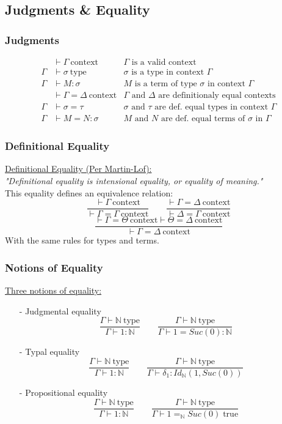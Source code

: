 \documentclass[aspectratio=169]{beamer}
\newcommand{\cntxt}{\ \mathrm{context}}
\newcommand{\typ}{\ \mathrm{type}}
\newcommand{\N}{\mathbb{N}}
\begin{document}
    \subsection{Judgments \& Equality}
    \begin{frame}
        \frametitle{Judgments}
        \begin{align*}
            &\vdash \Gamma \cntxt &\Gamma \text{ is a valid context}\\
            \Gamma &\vdash \sigma \typ &\sigma \text{ is a type in context $\Gamma$}\\
            \Gamma &\vdash M : \sigma &M\text{ is a term of type $\sigma$ in context $\Gamma$}\\
            &\vdash \Gamma = \Delta \cntxt &\text{$\Gamma$ and $\Delta$ are definitionaly equal contexts}\\
            \Gamma &\vdash \sigma = \tau &\text{$\sigma$ and $\tau$ are def. equal types in context $\Gamma$}\\
            \Gamma &\vdash M = N : \sigma &M\text{ and }N\text{ are def. equal terms of $\sigma$ in $\Gamma$}
        \end{align*}
    \end{frame}
    \begin{frame}
        \frametitle{Definitional Equality}
        \underline{Definitional Equality (Per Martin-Lof):}\\
        \vspace{10pt}
        \emph{"Definitional equality is intensional equality, or equality of meaning."}\\
        \vspace{10pt}
        This equality defines an equivalence relation:
        $$\frac{\vdash \Gamma \cntxt}{\vdash \Gamma = \Gamma \cntxt}\qquad \frac{\vdash \Gamma = \Delta \cntxt}{\vdash \Delta = \Gamma \cntxt}$$
        $$\frac{\vdash \Gamma = \Theta \cntxt \vdash \Theta = \Delta \cntxt}{\vdash \Gamma = \Delta \cntxt}$$
        With the same rules for types and terms.
    \end{frame}
    \begin{frame}
        \frametitle{Notions of Equality}
        \underline{Three notions of equality:}
        \begin{itemize}
            \item[-] Judgmental equality
            $$\frac{\Gamma \vdash \N \typ}{\Gamma \vdash 1:\N} \qquad \frac{\Gamma \vdash \N \typ}{\Gamma \vdash 1 = Suc(0):\N}$$
            \item[-] Typal equality
            $$\frac{\Gamma \vdash \N \typ}{\Gamma \vdash 1:\N} \qquad \frac{\Gamma \vdash \N \typ}{\Gamma \vdash \delta_1: Id_\N(1,Suc(0))}$$
            \item[-] Propositional equality
            $$\frac{\Gamma \vdash \N \typ}{\Gamma \vdash 1:\N} \qquad \frac{\Gamma \vdash \N \typ}{\Gamma \vdash 1 =_{\N} Suc(0) \; \mathrm{true}}$$
        \end{itemize}
    \end{frame}
\end{document}
